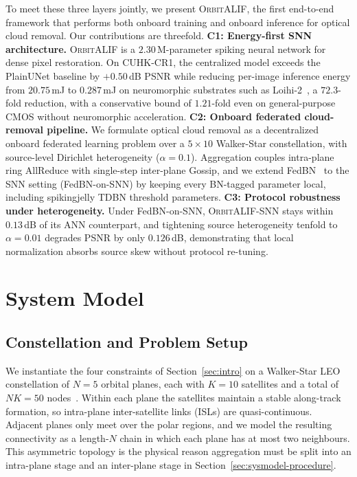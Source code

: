 \documentclass[conference]{IEEEtran}
\newcommand{\OrbitALIF}{\textsc{OrbitALIF}}
\begin{document}
To meet these three layers jointly, we present \OrbitALIF{}, the
first end-to-end framework that performs both onboard training and
onboard inference for optical cloud removal. Our contributions are
threefold.
\textbf{C1: Energy-first SNN architecture.} \OrbitALIF{} is a
$2.30$\,M-parameter spiking neural network for dense pixel
restoration. On CUHK-CR1, the centralized model exceeds the
PlainUNet baseline by $+0.50$\,dB PSNR while reducing per-image inference
energy from $20.75$\,mJ to $0.287$\,mJ on neuromorphic substrates
such as Loihi-2~\cite{ref:loihi}, a $72.3$-fold reduction, with a
conservative bound of $1.21$-fold even on general-purpose CMOS
without neuromorphic acceleration.
\textbf{C2: Onboard federated cloud-removal pipeline.} We formulate
optical cloud removal as a decentralized onboard federated learning
problem over a $5\!\times\!10$ Walker-Star constellation, with
source-level Dirichlet heterogeneity ($\alpha\!=\!0.1$). Aggregation
couples intra-plane ring AllReduce with single-step inter-plane
Gossip, and we extend FedBN~\cite{ref:fedbn} to the SNN setting
(FedBN-on-SNN)
by keeping every BN-tagged parameter local, including spikingjelly
TDBN threshold parameters.
\textbf{C3: Protocol robustness under heterogeneity.} Under
FedBN-on-SNN, \OrbitALIF{}-SNN stays within $0.13$\,dB of its ANN
counterpart, and tightening source heterogeneity tenfold to
$\alpha\!=\!0.01$ degrades PSNR by only $0.126$\,dB, demonstrating
that local normalization absorbs source skew without protocol
re-tuning.

\section{System Model}\label{sec:sysmodel}

\subsection{Constellation and Problem Setup}\label{sec:sysmodel-setup}

We instantiate the four constraints of Section~\ref{sec:intro} on a
Walker-Star LEO constellation of $N\!=\!5$ orbital planes, each with
$K\!=\!10$ satellites and a total of $NK\!=\!50$
nodes~\cite{ref:walker1984,ref:flsnn}. Within each plane the
satellites maintain a stable along-track formation, so intra-plane
inter-satellite links (ISLs) are quasi-continuous. Adjacent planes
only meet over the polar regions, and we model the resulting
connectivity as a length-$N$ chain in which each plane has at most
two neighbours. This asymmetric topology is the physical reason
aggregation must be split into an intra-plane stage and an
inter-plane stage in Section~\ref{sec:sysmodel-procedure}.
\end{document}
